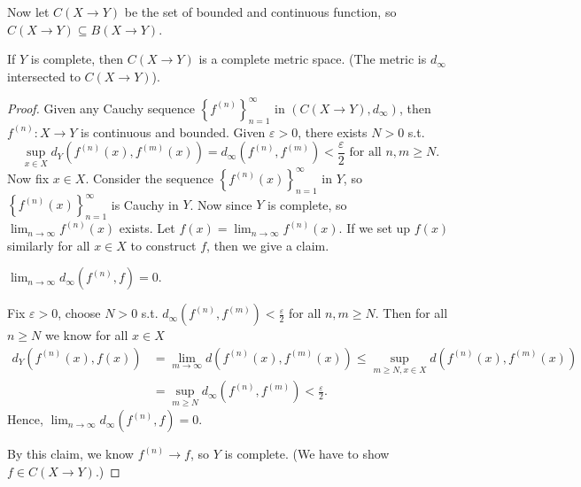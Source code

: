 Now let \(C(X \to Y)\) be the set of bounded and continuous function, so \(C(X \to Y) \subseteq B(X \to Y)\). 
\begin{theorem}
    If \(Y\) is complete, then \(C(X \to Y)\) is a complete metric space. (The metric is \(d_\infty \) intersected to \(C(X \to Y)\)).
\end{theorem}  
\begin{proof}
    Given any Cauchy sequence \(\left\{ f^{(n)} \right\}_{n=1}^{\infty}  \) in \(\left( C(X \to Y), d_\infty  \right) \), then \(f^{(n)}:X \to Y\) is continuous and bounded. Given \(\varepsilon > 0\), there exists \(N > 0\) s.t.  
    \[
        \sup _{x \in X} d_Y \left( f^{(n)}(x), f^{(m)}(x) \right)  = d_\infty \left( f^{(n)}, f^{(m)} \right) < \frac{\varepsilon}{2} \text{ for all } n, m \ge N.  
    \] Now fix \(x \in X\). Consider the sequence \(\left\{ f^{(n)}(x) \right\}_{n=1}^{\infty}  \) in \(Y\), so \(\left\{ f^{(n)}(x) \right\}_{n=1}^{\infty}  \) is Cauchy in \(Y\). Now since \(Y\) is complete, so \(\lim_{n \to \infty} f^{(n)}(x) \) exists. Let \(f(x) = \lim_{n \to \infty} f^{(n)}(x) \). If we set up \(f(x)\) similarly for all \(x \in X\) to construct \(f\), then we give a claim. 
    \begin{claim}
        \(\lim_{n \to \infty} d_\infty \left( f^{(n)}, f \right) = 0  \). 
    \end{claim}
    \begin{explanation}
        Fix \(\varepsilon > 0\), choose \(N > 0\) s.t. \(d_\infty \left( f^{(n)}, f^{(m)} \right) < \frac{\varepsilon}{2} \) for all \(n, m \ge N\). Then for all \(n \ge N\) we know for all \(x \in X\)  
        \begin{align*}
            d_Y \left( f^{(n)}(x), f(x) \right) &= \lim_{m \to \infty} d \left( f^{(n)}(x), f^{(m)}(x) \right) \le \sup _{m \ge N, x \in X} d \left( f^{(n)}(x), f^{(m)}(x) \right) \\
            &= \sup _{m \ge N} d_\infty \left( f^{(n)}, f^{(m)} \right) < \frac{\varepsilon}{2}.     
        \end{align*}   
        Hence, \(\lim_{n \to \infty} d_\infty \left( f^{(n)}, f \right) = 0\).  
    \end{explanation}          
    By this claim, we know \(f^{(n)} \to f\), so \(Y\) is complete.  
    (We have to show \(f \in C(X \to Y)\).)       
\end{proof}